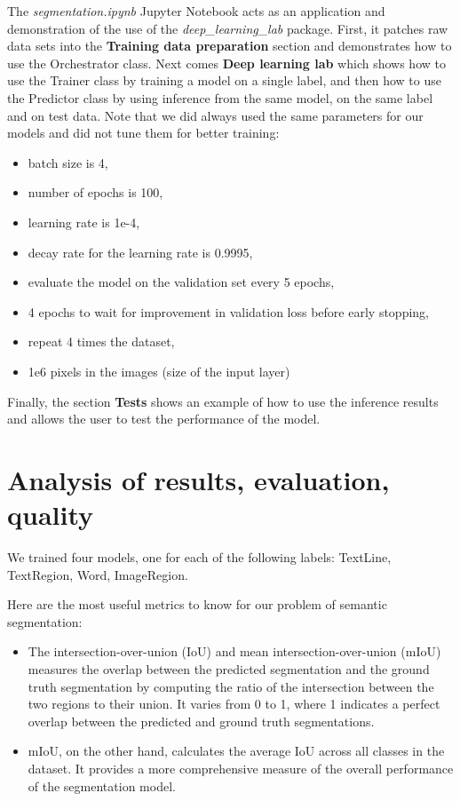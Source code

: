\documentclass{polytech/polytech}
\numberwithin{figure}{chapter}
\begin{document}
The {\it segmentation.ipynb} Jupyter Notebook acts as an application and demonstration of the use of the {\it deep_learning_lab} package.
First, it patches raw data sets into the {\bf Training data preparation} section and demonstrates how to use the Orchestrator class.
Next comes {\bf Deep learning lab} which shows how to use the Trainer class by training a model on a single label, and then how to use the Predictor class by using inference from the same model, on the same label and on test data.
Note that we did always used the same parameters for our models and did not tune them for better training: 
\begin{itemize}
\item batch size is 4,
\item number of epochs is 100,
\item learning rate is 1e-4,
\item decay rate for the learning rate is 0.9995,
\item evaluate the model on the validation set every 5 epochs,
\item 4 epochs to wait for improvement in validation loss before early stopping,
\item repeat 4 times the dataset,
\item 1e6 pixels in the images (size of the input layer)
\end{itemize}
Finally, the section {\bf Tests} shows an example of how to use the inference results and allows the user to test the performance of the model.

\section{Analysis of results, evaluation, quality}

We trained four models, one for each of the following labels: TextLine, TextRegion, Word, ImageRegion.

Here are the most useful metrics to know for our problem of semantic segmentation:
\begin{itemize}
\item The intersection-over-union (IoU) and mean intersection-over-union (mIoU) measures the overlap between the predicted segmentation and the ground truth segmentation by computing the ratio of the intersection between the two regions to their union.
It varies from 0 to 1, where 1 indicates a perfect overlap between the predicted and ground truth segmentations.
\item mIoU, on the other hand, calculates the average IoU across all classes in the dataset.
It provides a more comprehensive measure of the overall performance of the segmentation model.
\end{itemize}
\end{document}
